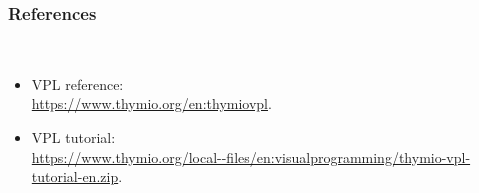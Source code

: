 \documentclass[a4paper]{leaflet}
\newcommand{\sct}[1]{\subsubsection{#1}\mbox{}\\}
\begin{document}
\vfill

\sct{References}

\begin{itemize}
\item VPL reference:\\
\url{https://www.thymio.org/en:thymiovpl}.

\item VPL tutorial:\\
\url{https://www.thymio.org/local--files/en:visualprogramming/thymio-vpl-tutorial-en.zip}.

\end{itemize}
\end{document}
